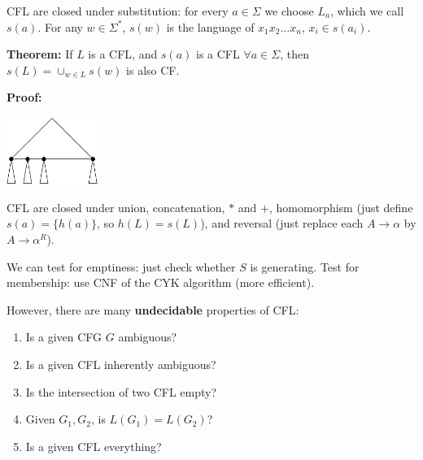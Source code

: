 \begin{frame}
CFL are closed under substitution: for every $a\in\Sigma$ we choose
$L_a$, which we call $s(a)$.  For any $w\in\Sigma^*$, $s(w)$ is the
language of $x_1x_2\ldots x_n$, $x_i\in s(a_i)$.

{\bf Theorem:} If $L$ is a CFL, and $s(a)$ is a CFL $\forall
a\in\Sigma$, then $s(L)=\cup_{w\in L}s(w)$ is also CF.

{\bf Proof:}
\begin{center}
\includegraphics[width=3cm]{figures/11.pdf}
\end{center}

CFL are closed under union, concatenation, $*$ and $+$, homomorphism
(just define $s(a)=\{h(a)\}$, so $h(L)=s(L)$), and reversal (just
replace each $A\longrightarrow\alpha$ by $A\longrightarrow\alpha^R$).
\end{frame}

\begin{frame}
We can test for emptiness: just check whether $S$ is generating.
Test for membership: use CNF of the CYK algorithm (more efficient).

However, there are many {\bf undecidable} properties of CFL:
\begin{enumerate}
\item  Is a given CFG $G$ ambiguous?
\item  Is a given CFL inherently ambiguous?
\item  Is the intersection of two CFL empty?
\item  Given $G_1,G_2$, is $L(G_1)=L(G_2)$?
\item  Is a given CFL everything?
\end{enumerate}
\end{frame}

